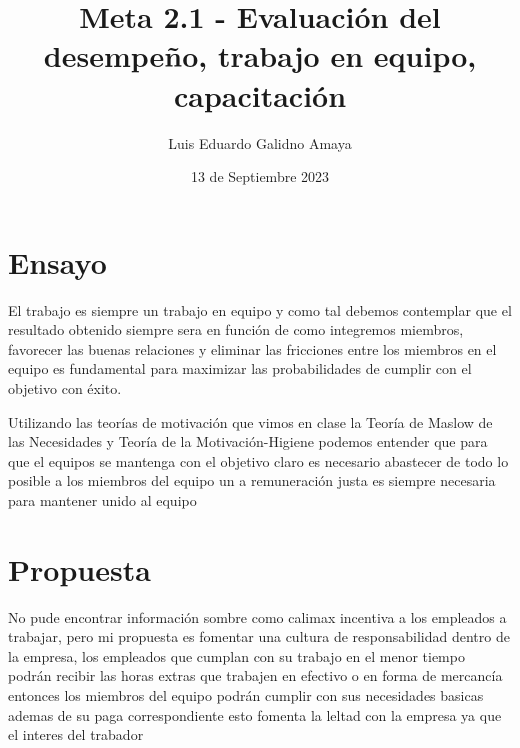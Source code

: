 \documentclass[11pt]{article}
\author{Luis Eduardo Galidno Amaya}
\date{13 de Septiembre 2023}
\title{Meta 2.1 - Evaluación del desempeño, trabajo en equipo, capacitación}
\begin{document}

\section{Ensayo}
\label{sec:org386a752}
El trabajo es siempre un trabajo en equipo y como tal debemos contemplar
que el resultado obtenido siempre sera en función de como integremos 
miembros, favorecer las buenas relaciones y eliminar las fricciones entre los
miembros en el equipo es fundamental para maximizar las probabilidades de 
cumplir con el objetivo con éxito.

Utilizando las teorías de motivación que  vimos en clase la Teoría de Maslow de
las Necesidades y Teoría de la Motivación-Higiene podemos entender que para que
el equipos se mantenga con el objetivo claro es necesario abastecer de todo lo
posible a los miembros del equipo un a remuneración justa es siempre necesaria
para mantener unido al equipo

\section{Propuesta}
\label{sec:orga4d0c40}
No pude encontrar información sombre como calimax incentiva a los empleados
a trabajar, pero mi propuesta es fomentar una cultura de responsabilidad dentro 
de la empresa, los empleados que cumplan con su trabajo en el menor tiempo 
podrán recibir las horas extras que trabajen en efectivo o en forma de mercancía
entonces los miembros del equipo podrán cumplir con sus necesidades basicas 
ademas de su paga correspondiente esto fomenta la leltad con la empresa ya 
que el interes del trabador  
\end{document}
